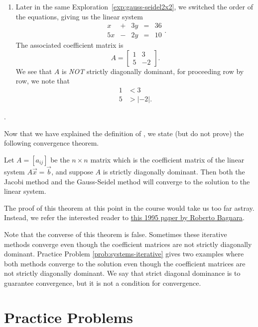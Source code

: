\documentclass{ximera}
\begin{document}
\begin{example}
\begin{explanation}
\begin{enumerate}
    \item Later in the same Exploration~\ref{exp:gauss-seidel2x2}, we switched the order of the equations, giving us the linear system 
  $$\begin{array}{ccccc}
      x & +&3y&= &36  \\
      5x& -&2y&=&10
    \end{array}.$$
    The associated coefficient matrix is 
    $$A=\left[\begin{array}{cc}  1&3 \\ 5&-2
 \end{array}\right].$$
    We see that $A$ is \emph{NOT} strictly diagonally dominant, for proceeding row by row, we note that
    \begin{align*}
        1 &< 3 \\
        5 &>  |-2|  .
    \end{align*}
\end{enumerate}.
\end{explanation}
\end{example}

Now that we have explained the definition of , we state (but do not prove) the following convergence theorem.

\begin{theorem}\label{th:strict_diag_dom}
Let $A=[a_{ij}]$ be the $n\times n$ matrix which is the coefficient matrix of the linear system $A \vec{x}= \vec{b}$, and suppose $A$ is strictly diagonally dominant.  Then both the Jacobi method and the Gauss-Seidel method will converge to the solution to the linear system.
\end{theorem}

The proof of this theorem at this point in the course would take us too far astray.  Instead, we refer the interested reader to
\href{https://www.jstor.org/stable/2132758}{this 1995 paper by Roberto Bagnara}.

Note that the converse of this theorem is false.  Sometimes these iterative methods converge even though the coefficient matrices are not strictly diagonally dominant.  Practice Problem \ref{prob:systems-iterative} gives two examples where both methods converge to the solution even though the coefficient matrices are not strictly diagonally dominant.  We say that strict diagonal dominance is  to guarantee convergence, but it is not a  condition for convergence.

\section*{Practice Problems}
\end{document}
